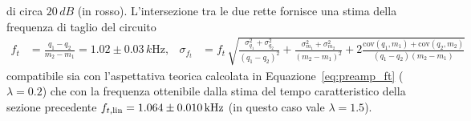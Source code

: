 di circa $20 \,dB$ (in rosso).
\noindent L'intersezione tra le due rette fornisce una stima
della frequenza di taglio del circuito
\begin{align}
  f_{t}&=\frac{q_{1}-q_{2}}{m_{2}-m_{1}}=1.02\pm 0.03\,\si{k\Hz},
  &
    \sigma_{f_{t}}&= f_{t}\,\sqrt{  \frac{\sigma_{q_{1}}^{2}+\sigma_{q_{2}}^{2}}{{(q_{1}-q_{2})}^{2} } +
                    \frac{\sigma_{m_{1}}^{2}+\sigma_{m_{2}}^{2}}{{(m_{2}-m_{1})}^{2} } +
                    2\frac{\text{cov}(q_{1},m_{1})+\text{cov}(q_{2},m_{2})}{(q_{1}-q_{2})(m_{2}-m_{1})} }
\end{align}
compatibile sia con l'aspettativa teorica calcolata in Equazione~\ref{eq:preamp_ft} ($\lambda=0.2$) che con la frequenza ottenibile dalla stima del tempo caratteristico
della sezione precedente $f_{t,\text{lin}}= 1.064\pm 0.010\kHz$ (in questo caso vale $\lambda=1.5$).
